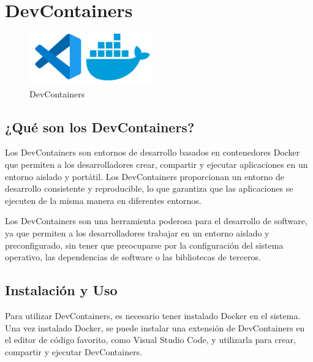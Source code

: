 \documentclass[
  a4paper,
  DIV=11,
  numbers=noendperiod,
  onepage,
  openany]{scrreprt}
\begin{document}
\chapter{DevContainers}\label{devcontainers}

\begin{figure}[H]

{\centering \includegraphics[width=2.08333in,height=\textheight,keepaspectratio]{unidades/unidad4/./images/dev-containers.png}

}

\caption{DevContainers}

\end{figure}%

\section{¿Qué son los
DevContainers?}\label{quuxe9-son-los-devcontainers}

Los DevContainers son entornos de desarrollo basados en contenedores
Docker que permiten a los desarrolladores crear, compartir y ejecutar
aplicaciones en un entorno aislado y portátil. Los DevContainers
proporcionan un entorno de desarrollo consistente y reproducible, lo que
garantiza que las aplicaciones se ejecuten de la misma manera en
diferentes entornos.

Los DevContainers son una herramienta poderosa para el desarrollo de
software, ya que permiten a los desarrolladores trabajar en un entorno
aislado y preconfigurado, sin tener que preocuparse por la configuración
del sistema operativo, las dependencias de software o las bibliotecas de
terceros.

\section{Instalación y Uso}\label{instalaciuxf3n-y-uso}

Para utilizar DevContainers, es necesario tener instalado Docker en el
sistema. Una vez instalado Docker, se puede instalar una extensión de
DevContainers en el editor de código favorito, como Visual Studio Code,
y utilizarla para crear, compartir y ejecutar DevContainers.
\end{document}
